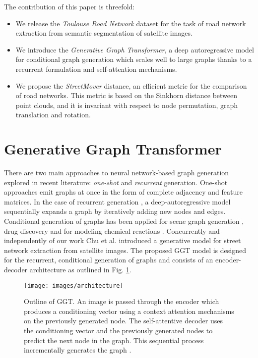 \documentclass{article}
\begin{document}
The contribution of this paper is threefold:
\begin{itemize}
    \item We release the \textit{Toulouse Road Network} dataset for the task of road network extraction from semantic segmentation of satellite images.
    \item We introduce the \textit{Generative Graph Transformer}, a deep autoregressive model for conditional graph generation which scales well to large graphs thanks to a recurrent formulation and self-attention mechanisms.
    \item We propose the \textit{StreetMover} distance, an efficient metric for the comparison of road networks. This metric is based on the Sinkhorn distance \citep{cuturi2013sinkhorn} between point clouds, and it is invariant with respect to node permutation, graph translation and rotation.
\end{itemize}



\section{Generative Graph Transformer}
There are two main approaches to neural network-based graph generation explored in recent literature: \textit{one-shot} and \textit{recurrent} generation. One-shot approaches \citep{simonovsky2018graphvae,de2018molgan,fan2019deep} emit graphs at once in the form of complete adjacency and feature matrices. In the case of recurrent generation \citep{li2018learning,liu2018constrained,you2018graphrnn,liao2019efficient}, a deep-autoregressive model sequentially expands a graph by iteratively adding new nodes and edges. Conditional generation of graphs has been applied for scene graph generation \citep{schuster2015generating,yang2018graph}, drug discovery \citep{li2018multi,simonovsky2018graphvae} and for modeling chemical reactions \citep{bradshaw2018generative}. Concurrently and independently of our work Chu et al. \citep{chu2019neural} introduced a generative model for street network extraction from satellite images. The proposed GGT model is designed for the recurrent, conditional generation of graphs and consists of an encoder-decoder architecture as outlined in Fig. \ref{fig:architecture}.

\begin{figure}[h]
    \centering
    \vskip -0.15in
    \texttt{[image: images/architecture]}
    \vskip -0.05in
\caption{Outline of GGT. An image  is passed through the encoder which produces a conditioning vector  using a context attention mechanisms on the previously generated node. The self-attentive decoder uses the conditioning vector and the previously generated nodes to predict the next node in the graph. This sequential process incrementally generates the graph .}
    \label{fig:architecture}
    \vskip -0.15in
\end{figure}
\end{document}
